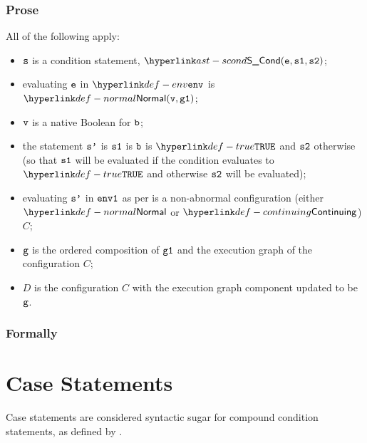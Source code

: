 \subsubsection{Prose}
All of the following apply:
\begin{itemize}
\item $\vs$ is a condition statement, $\SCond(\ve, \vsone, \vstwo)$;
\item evaluating $\ve$ in $\env$ is $\Normal(\vv, \vgone)$\ProseOrAbnormal;
\item $\vv$ is a native Boolean for $\vb$;
\item the statement $\vsp$ is $\vsone$ is $\vb$ is $\True$ and $\vstwo$ otherwise
(so that $\vsone$ will be evaluated if the condition evaluates to $\True$ and otherwise
$\vstwo$ will be evaluated);
\item evaluating $\vsp$ in $\envone$ as per  is a non-abnormal configuration
      (either $\Normal$ or $\Continuing$) $C$\ProseOrAbnormal;
\item $\vg$ is the ordered composition of $\vgone$ and the execution graph of the configuration $C$;
\item $D$ is the configuration $C$ with the execution graph component updated to be $\vg$.
\end{itemize}

\subsubsection{Formally}
\begin{mathpar}
\end{mathpar}

\section{Case Statements\label{sec:CaseStatements}}
Case statements are considered syntactic sugar for compound condition statements,
as defined by .

